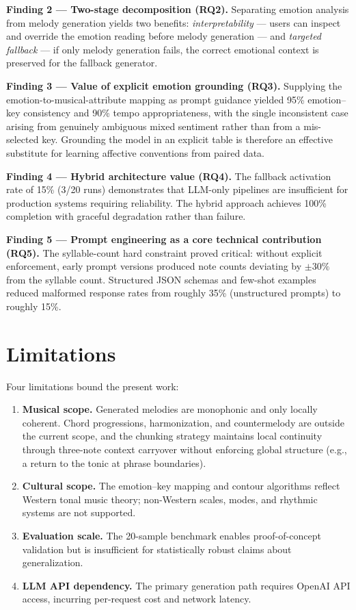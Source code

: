 \textbf{Finding 2 --- Two-stage decomposition (RQ2).} Separating emotion
analysis from melody generation yields two benefits: \emph{interpretability}
--- users can inspect and override the emotion reading before melody
generation --- and \emph{targeted fallback} --- if only melody generation
fails, the correct emotional context is preserved for the fallback
generator.

\textbf{Finding 3 --- Value of explicit emotion grounding (RQ3).} Supplying
the emotion-to-musical-attribute mapping as prompt guidance yielded 95\%
emotion--key consistency and 90\% tempo appropriateness, with the single
inconsistent case arising from genuinely ambiguous mixed sentiment rather
than from a mis-selected key. Grounding the model in an explicit table is
therefore an effective substitute for learning affective conventions from
paired data.

\textbf{Finding 4 --- Hybrid architecture value (RQ4).} The fallback
activation rate of 15\% (3/20 runs) demonstrates that LLM-only pipelines are
insufficient for production systems requiring reliability. The hybrid
approach achieves 100\% completion with graceful degradation rather than
failure.

\textbf{Finding 5 --- Prompt engineering as a core technical contribution
(RQ5).} The syllable-count hard constraint proved critical: without explicit
enforcement, early prompt versions produced note counts deviating by
$\pm30\%$ from the syllable count. Structured JSON schemas and few-shot
examples reduced malformed response rates from roughly 35\% (unstructured
prompts) to roughly 15\%.

\section{Limitations}
\label{sec:ev-limitations}

Four limitations bound the present work:

\begin{enumerate}
    \item \textbf{Musical scope.} Generated melodies are monophonic and
    only locally coherent. Chord progressions, harmonization, and
    countermelody are outside the current scope, and the chunking strategy
    maintains local continuity through three-note context carryover without
    enforcing global structure (e.g., a return to the tonic at phrase
    boundaries).
    \item \textbf{Cultural scope.} The emotion--key mapping and contour
    algorithms reflect Western tonal music theory; non-Western scales,
    modes, and rhythmic systems are not supported.
    \item \textbf{Evaluation scale.} The 20-sample benchmark enables
    proof-of-concept validation but is insufficient for statistically robust
    claims about generalization.
    \item \textbf{LLM API dependency.} The primary generation path requires
    OpenAI API access, incurring per-request cost and network latency.
\end{enumerate}

